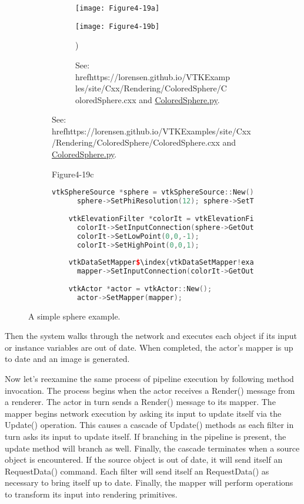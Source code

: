 \begin{description}[leftmargin=0cm,labelindent=0cm]
\begin{figure}[htb]
    \centering
    \begin{subfigure}[h]{0.96\linewidth}
        \begin{subfigure}[h]{0.48\linewidth}
        \texttt{[image: Figure4-19a]}
        \caption*{}
        \label{fig:Figure4-19a}
        \end{subfigure}
        \hfill
        \begin{subfigure}[h]{0.48\linewidth}
        \texttt{[image: Figure4-19b]}
        \caption*{See: href{https://lorensen.github.io/VTKExamples/site/Cxx/Rendering/ColoredSphere/}{ColoredSphere.cxx} and \href{https://lorensen.github.io/VTKExamples/site/Python/Rendering/ColoredSphere/}{ColoredSphere.py}.})
        \label{fig:Figure4-19b}
        \end{subfigure}
  \end{subfigure}
  \hfill
  \begin{subfigure}[h]{0.76\linewidth}{Figure4-19c}
  \begin{lstlisting}[language=C++,  caption={}, numbers=none, frame=none, escapechar=\$]
    vtkSphereSource *sphere = vtkSphereSource::New();
      sphere->SetPhiResolution(12); sphere->SetThetaResolution(12);
    
    vtkElevationFilter *colorIt = vtkElevationFilter::New();
      colorIt->SetInputConnection(sphere->GetOutputPort());
      colorIt->SetLowPoint(0,0,-1);
      colorIt->SetHighPoint(0,0,1);
    
    vtkDataSetMapper$\index{vtkDataSetMapper!example}$ *mapper = vtkDataSetMapper::New();
      mapper->SetInputConnection(colorIt->GetOutputPort());
      
    vtkActor *actor = vtkActor::New();
      actor->SetMapper(mapper);
    \end{lstlisting} 
    \caption*{}
  \end{subfigure}
  \caption{A simple sphere example.}\label{fig:Figure4-19}
\end{figure}

Then the system walks through the network and executes each object if its input or instance variables are out of date. When completed, the actor's mapper is up to date and an image is generated.

Now let's reexamine the same process of pipeline execution by following method invocation. The process begins when the actor receives a Render() message from a renderer. The actor in turn sends a Render() message to its mapper. The mapper begins network execution by asking its input to update itself via the Update() operation. This causes a cascade of Update() methods as each filter in turn asks its input to update itself. If branching in the pipeline is present, the update method will branch as well. Finally, the cascade terminates when a source object is encountered. If the source object is out of date, it will send itself an RequestData() command. Each filter will send itself an RequestData() as necessary to bring itself up to date. Finally, the mapper will perform operations to transform its input into rendering primitives.


\end{description}
